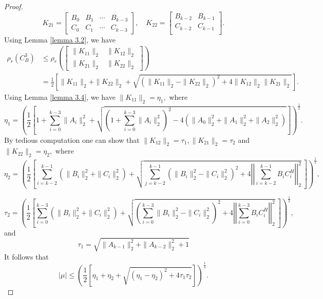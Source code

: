 \documentclass [12pt]{article}
\begin{document}
\begin{proof}
\[
K_{21} = 
\begin{bmatrix}
B_0 & B_1 & \cdots & B_{k-3}\\
C_0 & C_1 & \cdots & C_{k-3}
\end{bmatrix},  \quad K_{22} = 
\begin{bmatrix}
B_{k-2}&B_{k-1} \\
C_{k-2}&C_{k-1}\\ 
\end{bmatrix}.
\]
Using Lemma \ref{lemma 3.2}, we have \\
\begin{align*}
    \rho_{r}(C_{B}^{3}) &\le \rho_{r}\left( \begin{bmatrix}
    \|K_{11}\|_{2} & \|K_{12}\|_{2}\\
    \|K_{21}\|_{2} & \|K_{22}\|_{2}
\end{bmatrix}\right)\\& = \frac{1}{2} \left[ \|K_{11}\|_{2} + \|K_{22}\|_2 + \sqrt{\left( \|K_{11}\|_{2} - \|K_{22}\|_2  \right)^2 + 4 \|K_{12}\|_{2}\|K_{21}\|_{2} }
\right].
\end{align*}
Using Lemma \ref{lemma 3.4}, we have $\|K_{11}\|_{2}=\eta_{1},$ 
where \begin{equation*}
    \eta_{1}=\left( \frac{1}{2} \left[ 1+ \sum_{i=0}^{k-3}\|A_{i}\|^{2}_{2} 
    +\sqrt{\left( 1+ \sum_{i=0}^{k-3}\|A_{i}\|^{2}_{2}\right)^{2} -4\left(\|A_{0}\|^{2}_{2} +\|A_{1}\|^{2}_{2}+\|A_{2}\|^{2}_{2}\right) }\right] \right)^\frac{1}{2}.
\end{equation*}
By tedious computation one can show that  $\|K_{12}\|_{2}=\tau_{1}, \|K_{21}\|_{2}=\tau_{2} $ and $\|K_{22}\|_{2}=\eta_{2},$ where
\begin{equation*}
    \eta_{2}=\left( \frac{1}{2} \left[   \sum_{i=k-2}^{k-1} \left(\|B_{i}\|^{2}_{2}+\|C_{i}\|^{2}_{2} \right)    +\sqrt{\sum_{j=k-2}^{k-1} \left(\|B_{i}\|^{2}_{2}-\|C_{i}\|^{2}_{2} \right)^{2}+4\left|\left|\sum_{i=k-2}^{k-1}B_{i}{C_{i}^
    {H}} \right|\right|_{2}^{2}}~                   \right] \right)^{\frac{1}{2}},  
\end{equation*}


\begin{equation*}
\tau_{2}=\left( \frac{1}{2} \left[   \sum_{i=0}^{k-3} \left(\|B_{i}\|^{2}_{2}+\|C_{i}\|^{2}_{2} \right)    +\sqrt{ \left(\sum_{i=0}^{k-3}\|B_{i}\|^{2}_{2}-\|C_{i}\|^{2}_{2} \right)^{2}+4\left|\left|\sum_{i=0}^{k-3}B_{i}{C_{i}^{H}} \right|\right|_{2}^{2}}~                   \right] \right)^{\frac{1}{2}}, 
\end{equation*}
 and 
 \begin{equation*}
    \tau_{1}=\sqrt{\|A_{k-1}\|^{2}_{2}+\|A_{k-2}\|^{2}_{2}+1}
\end{equation*}
It follows that 
\begin{equation*}
|\mu| \le \left( \frac{1}{2} \left[ \eta _{1} + \eta_{2} +\sqrt{(\eta_{1}-\eta_{2})^{2}+4\tau_{1}\tau_{2} } \right] \right)^{\frac{1}{3}}.
\end{equation*}
\end{proof}
\end{document}
